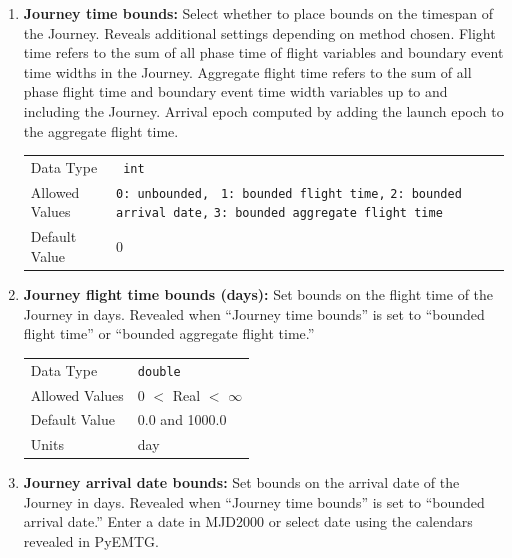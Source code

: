 \begin{enumerate}
    \item \textbf{Journey time bounds:} Select whether to place bounds on the timespan of the Journey. Reveals additional settings depending on method chosen. Flight time refers to the sum of all phase time of flight variables and boundary event time widths in the Journey. Aggregate flight time refers to the sum of all phase flight time and boundary event time width variables up to and including the Journey. Arrival epoch computed by adding the launch epoch to the aggregate flight time.
    
        
        \begin{table}[H]
            \hspace{2cm}
            \begin{tabular}{lp{3cm}}
            Data Type & \verb| int| \\
            Allowed Values & \verb|0: unbounded, |\newline
            \verb|1: bounded flight time,|\newline 
            \verb|2: bounded arrival date,|\newline
            \verb|3: bounded aggregate flight time|  \\
            Default Value & 0 \\
            \end{tabular}
        \end{table}

            \item \textbf{Journey flight time bounds (days):} Set bounds on the flight time of the Journey in days. Revealed when ``Journey time bounds'' is set to ``bounded flight time'' or ``bounded aggregate flight time.''
            
                \begin{table}[H]
                    \hspace{2cm}
                    \begin{tabular}{ll}
                    Data Type & \verb|double| \\
                    Allowed Values & 0 $<$ Real $<$ $\infty$ \\
                    Default Value & 0.0 and 1000.0\\
                    Units & day
                    \end{tabular}
                \end{table}

            \item \textbf{Journey arrival date bounds:} Set bounds on the arrival date of the Journey in days. Revealed when ``Journey time bounds'' is set to ``bounded arrival date.'' Enter a date in MJD2000 or select date using the calendars revealed in PyEMTG.           


\end{enumerate}
